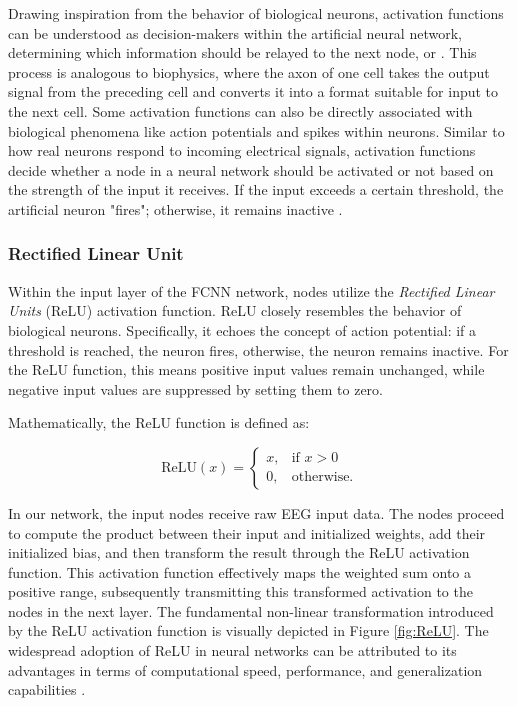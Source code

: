 \documentclass[a4paper, UKenglish, 11pt]{uiomaster}
\begin{document}
Drawing inspiration from the behavior of biological neurons, activation functions can be understood as decision-makers within the artificial neural network, determining which information should be relayed to the next node, or \cite{artificial neuron}. This process is analogous to biophysics, where the axon of one cell takes the output signal from the preceding cell and converts it into a format suitable for input to the next cell. Some activation functions can also be directly associated with biological phenomena like action potentials and spikes within neurons. Similar to how real neurons respond to incoming electrical signals, activation functions decide whether a node in a neural network should be activated or not based on the strength of the input it receives. If the input exceeds a certain threshold, the artificial neuron "fires"; otherwise, it remains inactive \cite{analyticsvidhya_activationfunctions}.


\subsubsection{Rectified Linear Unit}
Within the input layer of the FCNN network, nodes utilize the \emph{Rectified Linear Units} (ReLU) activation function.  ReLU closely resembles the behavior  of biological neurons. Specifically, it echoes the concept of action potential: if a threshold is reached, the neuron fires, otherwise, the neuron remains inactive. For the ReLU function, this means positive input values remain unchanged, while negative input values are suppressed by setting them to zero.

Mathematically, the ReLU function is defined as:

\begin{equation}
\text{ReLU}(x) = \begin{cases}
x, & \text{if } x > 0 \\
0, & \text{otherwise.}
\end{cases}
\label{eq:ReLU}
\end{equation}

In our network, the input nodes receive raw EEG input data. The nodes proceed to compute the product between their input and initialized weights, add their initialized bias, and then transform the result through the ReLU activation function. This activation function effectively maps the weighted sum onto a positive range, subsequently transmitting this transformed activation to the nodes in the next layer. The fundamental non-linear transformation introduced by the ReLU activation function is visually depicted in Figure \ref{fig:ReLU}. The widespread adoption of ReLU in neural networks can be attributed to its advantages in terms of computational speed, performance, and generalization capabilities \cite{wandb_activation_functions}.
\end{document}
